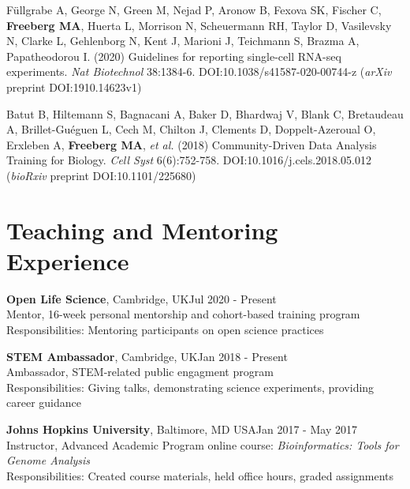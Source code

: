 \documentclass[margin,line]{res}
\begin{document}
\begin{resume}
Füllgrabe A, George N, Green M, Nejad P, Aronow B, Fexova SK, Fischer C, {\bf Freeberg MA}, Huerta L, Morrison N, Scheuermann RH, Taylor D, Vasilevsky N, Clarke L, Gehlenborg N, Kent J, Marioni J, Teichmann S, Brazma A, Papatheodorou I. (2020) Guidelines for reporting single-cell RNA-seq experiments. {\em Nat Biotechnol} 38:1384-6. DOI:10.1038/s41587-020-00744-z ({\em arXiv} preprint DOI:1910.14623v1)

Batut B, Hiltemann S, Bagnacani A, Baker D, Bhardwaj V, Blank C, Bretaudeau A, Brillet-Guéguen L, Cech M, Chilton J, Clements D, Doppelt-Azeroual O, Erxleben A, {\bf Freeberg MA}, {\em et al.} (2018) Community-Driven Data Analysis Training for Biology. {\em Cell Syst} 6(6):752-758. DOI:10.1016/j.cels.2018.05.012 ({\em bioRxiv} preprint DOI:10.1101/225680)

\section{\sc Teaching and Mentoring Experience}
{\bf Open Life Science}, Cambridge, UK\hfill {Jul 2020 - Present}\\
Mentor, 16-week personal mentorship and cohort-based training program\\
Responsibilities: Mentoring participants on open science practices

{\bf STEM Ambassador}, Cambridge, UK\hfill {Jan 2018 - Present}\\
Ambassador, STEM-related public engagment program\\
Responsibilities: Giving talks, demonstrating science experiments, providing career guidance

{\bf Johns Hopkins University}, Baltimore, MD USA\hfill {Jan 2017 - May 2017}\\
Instructor, Advanced Academic Program online course: {\em Bioinformatics: Tools for Genome Analysis}\\
Responsibilities: Created course materials, held office hours, graded assignments




\end{resume}
\end{document}
